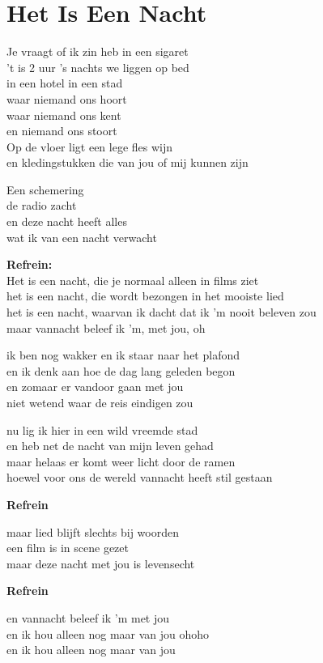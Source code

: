 \section{Het Is Een Nacht}
Je vraagt of ik zin heb in een sigaret\\
't is 2 uur 's nachts we liggen op bed\\
in een hotel in een stad\\
waar niemand ons hoort\\
waar niemand ons kent\\
en niemand ons stoort\\
Op de vloer ligt een lege fles wijn\\
en kledingstukken die van jou of mij kunnen zijn

Een schemering\\
de radio zacht\\
en deze nacht heeft alles\\
wat ik van een nacht verwacht

\textbf{Refrein:}\\
Het is een nacht, die je normaal alleen in films ziet\\
het is een nacht, die wordt bezongen in het mooiste lied\\
het is een nacht, waarvan ik dacht dat ik 'm nooit beleven zou\\
maar vannacht beleef ik 'm, met jou, oh

ik ben nog wakker en ik staar naar het plafond\\
en ik denk aan hoe de dag lang geleden begon\\
en zomaar er vandoor gaan met jou\\
niet wetend waar de reis eindigen zou

nu lig ik hier in een wild vreemde stad\\
en heb net de nacht van mijn leven gehad\\
maar helaas er komt weer licht door de ramen\\
hoewel voor ons de wereld vannacht heeft stil gestaan

\textbf{Refrein}

maar lied blijft slechts bij woorden\\
een film is in scene gezet\\
maar deze nacht met jou is levensecht

\textbf{Refrein}

en vannacht beleef ik 'm met jou\\
en ik hou alleen nog maar van jou ohoho\\
en ik hou alleen nog maar van jou
